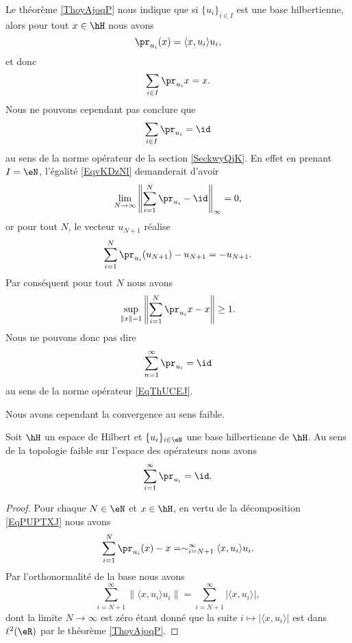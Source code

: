 Le théorème \ref{ThoyAjoqP} nous indique que si \( \{ u_i \}_{i\in I}\) est une base hilbertienne, alors pour tout \( x\in \hH\) nous avons
\begin{equation}
    \pr_{u_i}(x)=\langle x, u_i\rangle u_i,
\end{equation}
et donc
\begin{equation}
    \sum_{i\in I}\pr_{u_i}x=x.
\end{equation}
Nous ne pouvons cependant pas conclure que
\begin{equation}    \label{EqvKDzNl}
    \sum_{i\in I}\pr_{u_i}=\id
\end{equation}
au sens de la norme opérateur de la section \ref{SeckwyQjK}. En effet en prenant \( I=\eN\), l'égalité \eqref{EqvKDzNl} demanderait d'avoir
\begin{equation}
    \lim_{N\to \infty} \left\| \sum_{i=1}^N\pr_{u_i}-\id \right\|_{\infty}=0,
\end{equation}
or pour tout \( N\), le vecteur \( u_{N+1}\) réalise
\begin{equation}
    \sum_{i=1}^N\pr_{u_i}(u_{N+1})-u_{N+1}=-u_{N+1}.
\end{equation}
Par conséquent pour tout \( N\) nous avons
\begin{equation}
    \sup_{\| x \|=1}\left\| \sum_{i=1}^N\pr_{u_i}x-x \right\|\geq 1.
\end{equation}
Nous ne pouvons donc pas dire
\begin{equation}
    \sum_{n=1}^{\infty}\pr_{u_i}=\id
\end{equation}
au sens de la norme opérateur \eqref{EqThUCEJ}. 

Nous avons cependant la convergence au sens faible.
\begin{proposition}
    Soit \( \hH\) un espace de Hilbert et \( \{ u_i \}_{i\in \eN}\) une base hilbertienne de \( \hH\). Au sens de la topologie faible sur l'espace des opérateurs nous avons
    \begin{equation}
        \sum_{i=1}^{\infty}\pr_{u_i}=\id.
    \end{equation}
\end{proposition}

\begin{proof}
    Pour chaque \( N\in \eN\) et \( x\in\hH\), en vertu de la décomposition \eqref{EqPUPTXJ} nous avons
    \begin{equation}
        \sum_{i=1}^N\pr_{u_i}(x)-x=\sim_{i=N+1}^{\infty}\langle x, u_i\rangle u_i.
    \end{equation}
    Par l'orthonormalité de la base nous avons
    \begin{equation}
        \sum_{i=N+1}^{\infty}\| \langle x, u_i\rangle u_i \|=\sum_{i=N+1}^{\infty}| \langle x, u_i\rangle  |,
    \end{equation}
    dont la limite \( N\to \infty\) est zéro étant donné que la suite \( i\mapsto| \langle x, u_i\rangle  |\) est dans \( \ell^2(\eR)\) par le théorème \ref{ThoyAjoqP}.
\end{proof}

